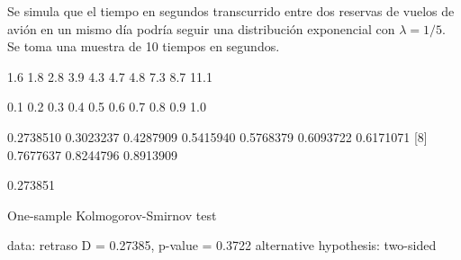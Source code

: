 \documentclass[10pt]{article}
\newcounter{problemes}
\newcounter{punts} \def\thepunts{\arabic{punts}}
\def\probl{\addtocounter{problemes}{1} \setcounter{punts}{0}
\medskip\noindent{\bf \theproblemes) }}
\def\punt{\addtocounter{punts}{1} \smallskip{\emph{\thepunts) }}}
\begin{document}
% 
% 
% 
% 
% 
% 
% 
% 
% 
% 
% 
% 
% 



\probl Se simula que el tiempo en segundos transcurrido entre dos reservas de vuelos de avión  en un mismo día podría seguir una distribución exponencial con  $\lambda=1/5$. Se  toma una muestra de 10 tiempos en segundos. 

\begin{Schunk}
\begin{Soutput}
 [1]  1.6  1.8  2.8  3.9  4.3  4.7  4.8  7.3  8.7 11.1
\end{Soutput}
\begin{Soutput}
 [1] 0.1 0.2 0.3 0.4 0.5 0.6 0.7 0.8 0.9 1.0
\end{Soutput}
\begin{Soutput}
 [1] 0.2738510 0.3023237 0.4287909 0.5415940 0.5768379 0.6093722 0.6171071
 [8] 0.7677637 0.8244796 0.8913909
\end{Soutput}
\begin{Soutput}
[1] 0.273851
\end{Soutput}
\begin{Soutput}
	One-sample Kolmogorov-Smirnov test

data:  retraso
D = 0.27385, p-value = 0.3722
alternative hypothesis: two-sided
\end{Soutput}
\end{Schunk}
\end{document}
